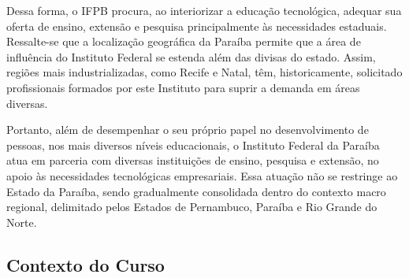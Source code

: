	Dessa forma, o IFPB procura, ao interiorizar a educação tecnológica, adequar sua oferta de ensino, extensão e pesquisa principalmente às necessidades estaduais. Ressalte-se que a localização geográfica da Paraíba permite que a área de influência do Instituto Federal se estenda além das divisas do estado. Assim, regiões mais industrializadas, como Recife e Natal, têm, historicamente, solicitado profissionais formados por este Instituto para suprir a demanda em áreas diversas.
	
	Portanto, além de desempenhar o seu próprio papel no desenvolvimento de pessoas, nos mais diversos níveis educacionais, o Instituto Federal da Paraíba atua em parceria com diversas instituições de ensino, pesquisa e extensão, no apoio às necessidades tecnológicas empresariais. Essa atuação não se restringe ao Estado da Paraíba, sendo gradualmente consolidada dentro do contexto macro regional, delimitado pelos Estados de Pernambuco, Paraíba e Rio Grande do Norte.



\subsection{Contexto do Curso}
